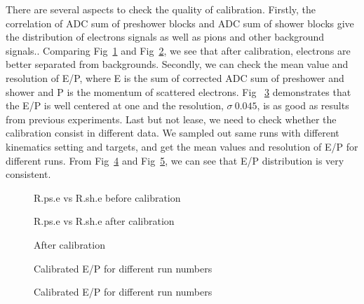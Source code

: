   There are several aspects to check the quality of calibration. Firstly, the correlation of ADC sum of preshower blocks and ADC sum of shower blocks give the distribution of electrons signals as well as pions and other background signals.. Comparing Fig~\ref{psvssh_before} and Fig~\ref{psvssh_after}, we see that after calibration, electrons are better separated from backgrounds. Secondly, we can check the mean value and resolution of E/P, where E is the sum of corrected ADC sum of preshower and shower and P is the momentum of scattered electrons. Fig ~\ref{ep_mean} demonstrates that the E/P is well centered at one and the resolution, $\sigma~0.045$, is as good as results from previous experiments. Last but not lease, we need to check whether the calibration consist in different data. We sampled out same runs with different kinematics setting and targets, and get the mean values and resolution of E/P for different runs. From Fig~\ref{ep_stability} and Fig~\ref{ep_resol}, we can see that E/P distribution is very consistent.

\begin{figure}[htb]
\centerline{}
\caption[R.ps.e vs R.sh.e before calibration]{\footnotesize{R.ps.e vs R.sh.e before calibration}
\label{psvssh_before}}
\end{figure}

\begin{figure}[htb]
\centerline{}
\caption[R.ps.e vs R.sh.e after calibration]{\footnotesize{R.ps.e vs R.sh.e after calibration}
\label{psvssh_after}}
\end{figure}

\begin{figure}[htb]
\centerline{}
\caption[After calibration]{\footnotesize{After calibration}
\label{ep_mean}}
\end{figure}

\begin{figure}[htb]
\centerline{}
\caption[Calibrated E/P for different run numbers]{\footnotesize{Calibrated E/P for different run numbers}
\label{ep_stability}}
\end{figure}

\begin{figure}[htb]
\centerline{}
\caption[Calibrated E/P for different run numbers]{\footnotesize{Calibrated E/P for different run numbers}
\label{ep_resol}}
\end{figure}

